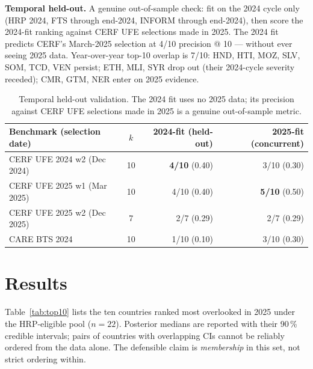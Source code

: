 \documentclass[11pt,a4paper]{article}
\begin{document}
\textbf{Temporal held-out.} A genuine out-of-sample check: fit on the 2024
cycle only (HRP 2024, FTS through end-2024, INFORM through end-2024), then
score the 2024-fit ranking against CERF UFE selections made in 2025. The
2024 fit predicts CERF's March-2025 selection at 4/10 precision @ 10 ---
without ever seeing 2025 data. Year-over-year top-10 overlap is 7/10: HND,
HTI, MOZ, SLV, SOM, TCD, VEN persist; ETH, MLI, SYR drop out (their
2024-cycle severity receded); CMR, GTM, NER enter on 2025 evidence.

\begin{table}[H]
\centering
\small
\begin{tabular}{@{}lcrr@{}}
\toprule
\textbf{Benchmark (selection date)} & \textbf{$k$} & \textbf{2024-fit (held-out)} & \textbf{2025-fit (concurrent)} \\
\midrule
CERF UFE 2024 w2 (Dec 2024)  & 10 & \textbf{4/10} (0.40) & 3/10 (0.30) \\
CERF UFE 2025 w1 (Mar 2025)  & 10 & 4/10 (0.40)          & \textbf{5/10} (0.50) \\
CERF UFE 2025 w2 (Dec 2025)  & 7  & 2/7 (0.29)           & 2/7 (0.29) \\
CARE BTS 2024                & 10 & 1/10 (0.10)          & 3/10 (0.30) \\
\bottomrule
\end{tabular}
\caption{Temporal held-out validation. The 2024 fit uses no 2025 data; its
precision against CERF UFE selections made in 2025 is a genuine out-of-sample
metric.\label{tab:temporal}}
\end{table}

\section{Results}\label{sec:results}

Table~\ref{tab:top10} lists the ten countries ranked most overlooked in 2025
under the HRP-eligible pool ($n = 22$). Posterior medians are reported with
their 90\,\% credible intervals; pairs of countries with overlapping CIs
cannot be reliably ordered from the data alone. The defensible claim is
\emph{membership} in this set, not strict ordering within.
\end{document}
